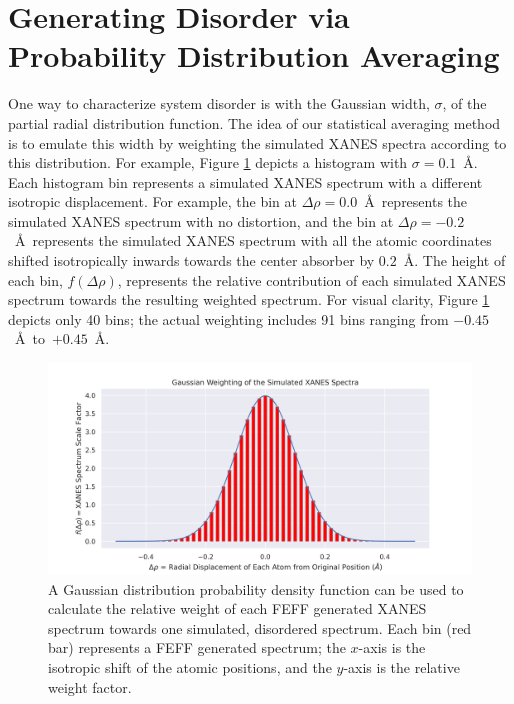\section{Generating Disorder via Probability Distribution Averaging}

One way to characterize system disorder is with the Gaussian width, $ \sigma $, of the partial radial distribution function. The idea of our statistical averaging method is to emulate this width by weighting the simulated XANES spectra according to this distribution. For example, Figure \ref{fig:gaussian-weighting-hist} depicts a histogram with $ \sigma=0.1 $~\AA. Each histogram bin represents a simulated XANES spectrum with a different isotropic displacement. For example, the bin at $ \Delta\rho=0.0 $~\AA~represents the simulated XANES spectrum with no distortion, and the bin at $ \Delta\rho=-0.2 $~\AA~represents the simulated XANES spectrum with all the atomic coordinates shifted isotropically inwards towards the center absorber by $ 0.2 $~\AA. The height of each bin, $ f(\Delta\rho) $, represents the relative contribution of each simulated XANES spectrum towards the resulting weighted spectrum. For visual clarity, Figure \ref{fig:gaussian-weighting-hist} depicts only 40 bins; the actual weighting includes 91 bins ranging from $ -0.45 $~\AA~to~$ +0.45 $~\AA.
\begin{figure}[h!]
	\centering
	\includegraphics[width=\linewidth]{Chapters/Figures/gaussian-weighting-hist.png}
	\caption[Simulated Spectrum Gaussian Weighting]{A Gaussian distribution probability density function can be used to calculate the relative weight of each FEFF generated XANES spectrum towards one simulated, disordered spectrum. Each bin (red bar) represents a FEFF generated spectrum; the $x$-axis is the isotropic shift of the atomic positions, and the $y$-axis is the relative weight factor.}
	\label{fig:gaussian-weighting-hist}
\end{figure}

